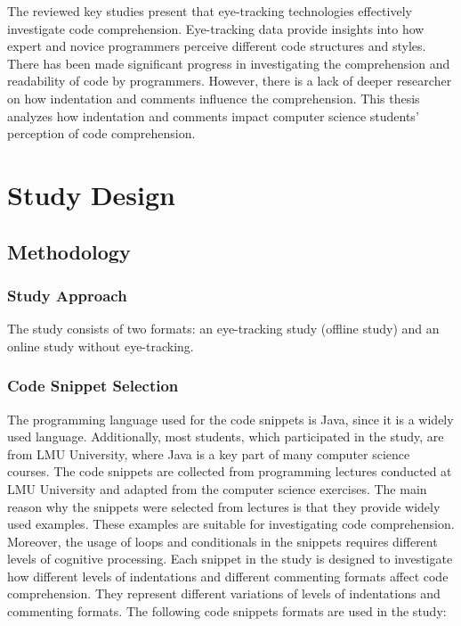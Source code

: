 The reviewed key studies present that eye-tracking technologies effectively investigate code comprehension.  Eye-tracking data provide insights into how expert and novice programmers perceive different code structures and styles. There has been made significant progress in investigating the comprehension and readability of code by programmers.  However, there is a lack of deeper researcher on how indentation and comments influence the comprehension. 
This thesis analyzes how indentation and comments impact computer science students’ perception of code comprehension.  


\chapter{Study Design}



\section{Methodology}

\subsection{Study Approach}
The study consists of two formats: an eye-tracking study (offline study) and an online study without eye-tracking. 

\subsection{Code Snippet Selection}

The programming language used for the code snippets is Java, since it is a widely used language.  Additionally, most students, which participated in the study, are from LMU University, where Java is a key part of many computer science courses.  The code snippets are collected from programming lectures conducted at LMU University and adapted from the computer science exercises. The main reason why the snippets were selected from lectures is that they provide widely used examples. These examples are suitable for investigating code comprehension. Moreover, the usage of loops and conditionals in the snippets requires different levels of cognitive processing.    
Each snippet in the study is designed to investigate how different levels of indentations and different commenting formats affect code comprehension.  They represent different variations of levels of indentations and commenting formats.  The following code snippets formats are used in the study:



